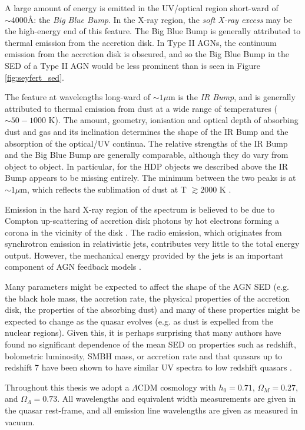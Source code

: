 A large amount of energy is emitted in the UV/optical region short-ward of $\sim4000$\AA: the {\it Big Blue Bump}. In the X-ray region, the {\it soft X-ray excess} may be the high-energy end of this feature. 
The Big Blue Bump is generally attributed to thermal emission from the accretion disk. 
In Type II AGNs, the continuum emission from the accretion disk is obscured, and so the Big Blue Bump in the SED of a Type II AGN would be less prominent than is seen in Figure \ref{fig:seyfert_sed}. 

The feature at wavelengths long-ward of $\sim1\mu$m is the {\it IR Bump}, and is generally attributed  to thermal emission from dust at a wide range of temperatures ($\sim50 - 1000$ K). 
The amount, geometry, ionisation and optical depth of absorbing dust and gas and its inclination determines the shape of the IR Bump and the absorption of the optical/UV continua. 
The relative strengths of the IR Bump and the Big Blue Bump are generally comparable, although they do vary from object to object. 
In particular, for the HDP objects we described above the IR Bump appears to be missing entirely. 
The minimum between the two peaks is at $\sim1\mu$m, which reflects the sublimation of dust at T $\gtrsim 2000$ K \citep{sanders89}.

Emission in the hard X-ray region of the spectrum is believed to be due to Compton up-scattering of accretion disk photons by hot electrons forming a corona in the vicinity of the disk \citep[e.g.][]{sunyaev80}. 
The radio emission, which originates from synchrotron emission in relativistic jets, contributes very little to the total energy output.
However, the mechanical energy provided by the jets is an important component of AGN feedback models \citep[e.g.][]{fabian12}. 

Many parameters might be expected to affect the shape of the AGN SED (e.g. the black hole mass, the accretion rate, the physical properties of the accretion disk, the properties of the absorbing dust) and many of these properties might be expected to change as the quasar evolves (e.g. as dust is expelled from the nuclear regions). Given this, it is perhaps surprising that many authors have found no significant dependence of the mean SED on properties such as redshift, bolometric luminosity, SMBH mass, or accretion rate \citep[e.g.][]{elvis12,hao13} and that quasars up to redshift 7 have been shown to have similar UV spectra to low redshift quasars \citep[e.g.][]{mortlock11}.

Throughout this thesis we adopt a $\Lambda$CDM cosmology with $h_0=0.71$, $\Omega_M=0.27$, and $\Omega_\Lambda=0.73$. 
All wavelengths and equivalent width measurements are given in the quasar rest-frame, and all emission line wavelengths are given as measured in vacuum.

